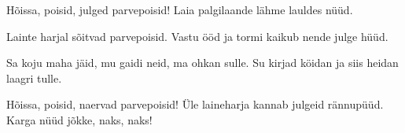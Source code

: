 H\~oissa, poisid,
julged parvepoisid!
Laia palgilaande
l\"ahme lauldes n\"u\"ud.

Lainte harjal
s\~oitvad parvepoisid.
Vastu \"o\"od ja tormi
kaikub nende julge h\"u\"ud.

Sa koju maha j\"aid,
mu gaidi neid,
ma ohkan sulle.
Su kirjad k\"oidan
ja siis heidan
laagri tulle.

H\~oissa, poisid,
naervad parvepoisid!
\"Ule laineharja
kannab julgeid r\"annup\"u\"ud.
Karga n\"u\"ud j\~okke, naks, naks!
